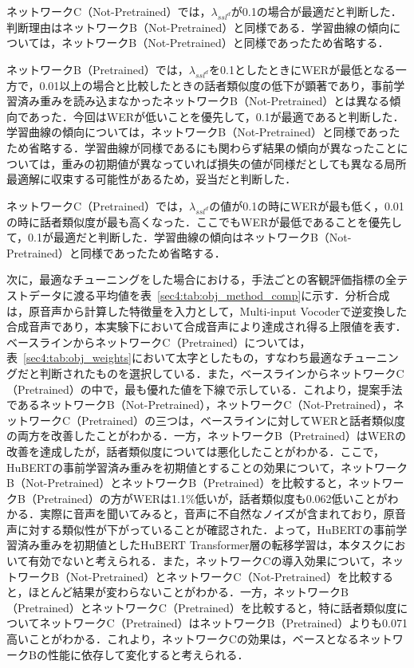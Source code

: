 \documentclass[12pt]{jarticle}
\numberwithin{equation}{section}    %
\numberwithin{figure}{section}      %
\numberwithin{table}{section}      %
\begin{document}
ネットワークC（Not-Pretrained）では，$\lambda_{ssl^{d}}$が0.1の場合が最適だと判断した．判断理由はネットワークB（Not-Pretrained）と同様である．学習曲線の傾向については，ネットワークB（Not-Pretrained）と同様であったため省略する．

ネットワークB（Pretrained）では，$\lambda_{ssl^{d}}$を0.1としたときにWERが最低となる一方で，0.01以上の場合と比較したときの話者類似度の低下が顕著であり，事前学習済み重みを読み込まなかったネットワークB（Not-Pretrained）とは異なる傾向であった．今回はWERが低いことを優先して，0.1が最適であると判断した．学習曲線の傾向については，ネットワークB（Not-Pretrained）と同様であったため省略する．学習曲線が同様であるにも関わらず結果の傾向が異なったことについては，重みの初期値が異なっていれば損失の値が同様だとしても異なる局所最適解に収束する可能性があるため，妥当だと判断した．

ネットワークC（Pretrained）では，$\lambda_{ssl^{d}}$の値が0.1の時にWERが最も低く，0.01の時に話者類似度が最も高くなった．ここでもWERが最低であることを優先して，0.1が最適だと判断した．学習曲線の傾向はネットワークB（Not-Pretrained）と同様であったため省略する．

次に，最適なチューニングをした場合における，手法ごとの客観評価指標の全テストデータに渡る平均値を表~\ref{sec4:tab:obj_method_comp}に示す．分析合成は，原音声から計算した特徴量を入力として，Multi-input Vocoderで逆変換した合成音声であり，本実験下において合成音声により達成され得る上限値を表す．ベースラインからネットワークC（Pretrained）については，表~\ref{sec4:tab:obj_weights}において太字としたもの，すなわち最適なチューニングだと判断されたものを選択している．また，ベースラインからネットワークC（Pretrained）の中で，最も優れた値を下線で示している．これより，提案手法であるネットワークB（Not-Pretrained），ネットワークC（Not-Pretrained），ネットワークC（Pretrained）の三つは，ベースラインに対してWERと話者類似度の両方を改善したことがわかる．一方，ネットワークB（Pretrained）はWERの改善を達成したが，話者類似度については悪化したことがわかる．ここで，HuBERTの事前学習済み重みを初期値とすることの効果について，ネットワークB（Not-Pretrained）とネットワークB（Pretrained）を比較すると，ネットワークB（Pretrained）の方がWERは1.1\%低いが，話者類似度も0.062低いことがわかる．実際に音声を聞いてみると，音声に不自然なノイズが含まれており，原音声に対する類似性が下がっていることが確認された．よって，HuBERTの事前学習済み重みを初期値としたHuBERT Transformer層の転移学習は，本タスクにおいて有効でないと考えられる．また，ネットワークCの導入効果について，ネットワークB（Not-Pretrained）とネットワークC（Not-Pretrained）を比較すると，ほとんど結果が変わらないことがわかる．一方，ネットワークB（Pretrained）とネットワークC（Pretrained）を比較すると，特に話者類似度についてネットワークC（Pretrained）はネットワークB（Pretrained）よりも0.071高いことがわかる．これより，ネットワークCの効果は，ベースとなるネットワークBの性能に依存して変化すると考えられる．
\end{document}
